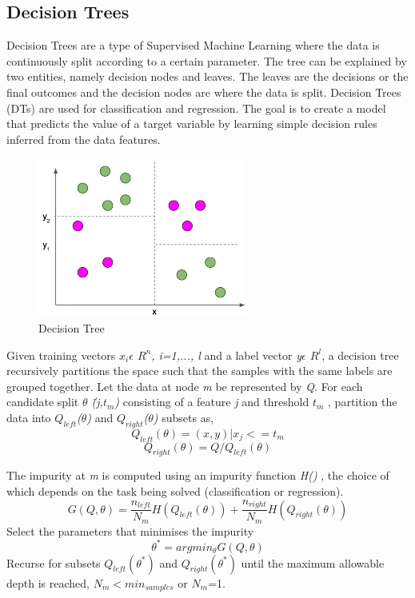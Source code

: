 \documentclass[a4paper, 10pt, conference]{IEEEtran}
\begin{document}
\subsection{Decision Trees}
Decision Trees are a type of Supervised Machine Learning where the data is continuously split according to a certain parameter. The tree can be explained by two entities, namely decision nodes and leaves. The leaves are the decisions or the final outcomes and the decision nodes are where the data is split.
Decision Trees (DTs) are used for classification and regression. The goal is to create a model that predicts the value of a target variable by learning simple decision rules inferred from the data features.
\begin{figure}
  \includegraphics[width=\linewidth]{DecisionTree.png}
  \caption{Decision Tree}
  \label{fig:dt}
\end{figure}

Given training vectors \textit{$x_{i}\epsilon$ $R^{n}$, i=1,..., l} and a label  vector \textit{y$\epsilon$ $R^{l}$}, a decision tree recursively partitions the space such that the samples with the same labels are grouped together.
Let the data at node \textit{m} be represented by \textit{Q}. For each candidate split \textit{$\theta$ \= (j,$t_{m}$)} consisting of a feature \textit{j} and threshold \textit{$t_{m}$} , partition the data into \textit{$Q_{left}$($\theta$)} and \textit{$Q_{right}$($\theta$)} subsets as,
\[ Q_{left}(\theta) = (x,y)|x_{j}<=t_{m}
\]
\[ Q_{right}(\theta) = Q/Q_{left}(\theta)
\]

The impurity at \textit{m} is computed using an impurity function \textit{H()} , the choice of which depends on the task being solved (classification or regression).
\[ G(Q,\theta) = \frac{n_{left}}{N_{m}}H(Q_{left}(\theta)) + \frac{n_{right}}{N_{m}}H(Q_{right}(\theta))
\]
Select the parameters that minimises the impurity
\[ \theta^{\ast} = arg min_{\theta}G(Q,\theta)
\]
Recurse for subsets \textit{$Q_{left}(\theta^{\ast})$} and \textit{$Q_{right}(\theta^{\ast})$} until the maximum allowable depth is reached, \textit{$N_{m}< min_{samples}$} or \textit{$N_{m}$}=1.
\\
\end{document}
